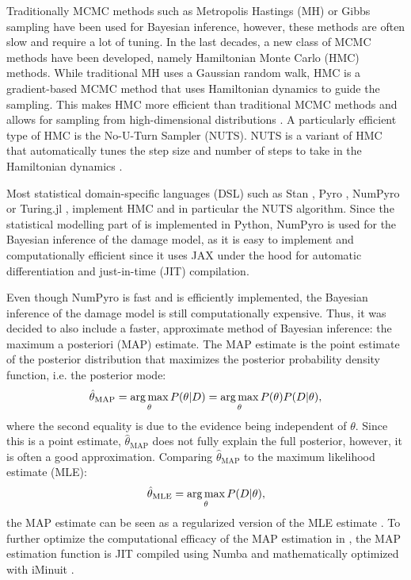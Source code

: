 Traditionally MCMC methods such as Metropolis Hastings (MH) or Gibbs sampling have been used for Bayesian inference, however, these methods are often slow and require a lot of tuning. In the last decades, a new class of MCMC methods have been developed, namely Hamiltonian Monte Carlo (HMC) methods. While traditional MH uses a Gaussian random walk, HMC is a gradient-based MCMC method that uses Hamiltonian dynamics to guide the sampling. This makes HMC more efficient than traditional MCMC methods and allows for sampling from high-dimensional distributions \autocite{betancourtConceptualIntroductionHamiltonian2018,nealMCMCUsingHamiltonian2011}. A particularly efficient type of HMC is the No-U-Turn Sampler (NUTS). NUTS is a variant of HMC that automatically tunes the step size and number of steps to take in the Hamiltonian dynamics \autocite{homanNoUturnSamplerAdaptively2014}.

Most statistical domain-specific languages (DSL) such as Stan \autocite{carpenterStanProbabilisticProgramming2017}, Pyro \autocite{binghamPyroDeepUniversal2019}, NumPyro \autocite{phanComposableEffectsFlexible2019} or Turing.jl \autocite{geTuringLanguageFlexible2018}, implement HMC and in particular the NUTS algorithm. Since the statistical modelling part of \metaDMG is implemented in Python, NumPyro is used for the Bayesian inference of the damage model, as it is easy to implement and computationally efficient since it uses JAX \autocite{bradburyJAXComposableTransformations2018} under the hood for automatic differentiation and just-in-time (JIT) compilation.

Even though NumPyro is fast and \metaDMG is efficiently implemented, the Bayesian inference of the damage model is still computationally expensive. Thus, it was decided to also include a faster, approximate method of Bayesian inference: the maximum a posteriori (MAP) estimate. The MAP estimate is the point estimate of the posterior distribution that maximizes the posterior probability density function, i.e. the posterior mode:
\begin{align}
    \hat{\theta}_\mathrm{MAP} = \operatorname*{arg\,max}_\theta P(\theta|D) = \operatorname*{arg\,max}_\theta P(\theta)P(D|\theta),
\end{align}
where the second equality is due to the evidence being independent of $\theta$. Since this is a point estimate, $\hat{\theta}_\mathrm{MAP}$ does not fully explain the full posterior, however, it is often a good approximation. Comparing $\hat{\theta}_\mathrm{MAP}$ to the maximum likelihood estimate (MLE):
\begin{align}
    \hat{\theta}_\mathrm{MLE} = \operatorname*{arg\,max}_\theta P(D|\theta),
\end{align}
the MAP estimate can be seen as a regularized version of the MLE estimate \autocite{murphyMachineLearningProbabilistic2012}. To further optimize the computational efficacy of the MAP estimation in \metaDMG, the MAP estimation function is JIT compiled using Numba \autocite{lamNumbaLLVMbasedPython2015} and mathematically optimized with iMinuit \autocite{dembinskiScikithepIminuitV22021}.

